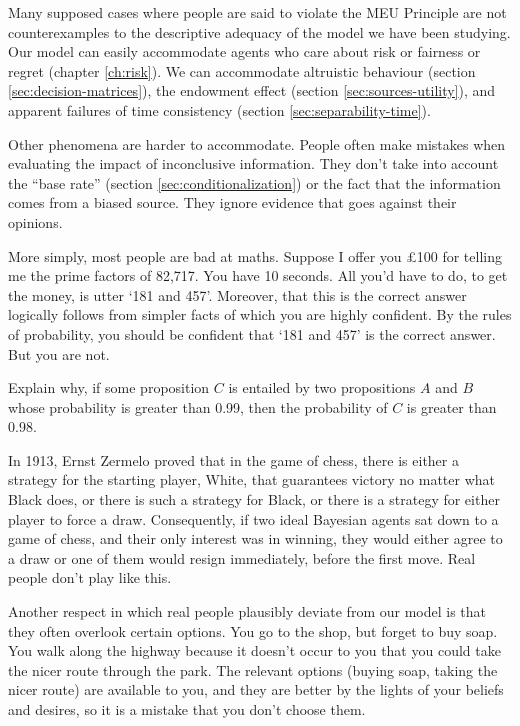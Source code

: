 Many supposed cases where people are said to violate the MEU Principle are not
counterexamples to the descriptive adequacy of the model we have been studying.
Our model can easily accommodate agents who care about risk or fairness or
regret (chapter \ref{ch:risk}). We can accommodate altruistic behaviour (section
\ref{sec:decision-matrices}), the endowment effect (section
\ref{sec:sources-utility}), and apparent failures of time consistency (section
\ref{sec:separability-time}).

Other phenomena are harder to accommodate. People often make mistakes when
evaluating the impact of inconclusive information. They don't take into account
the ``base rate'' (section \ref{sec:conditionalization}) or the fact that the
information comes from a biased source. They ignore evidence that goes against
their opinions.

More simply, most people are bad at maths. Suppose I offer you £100 for telling
me the prime factors of 82,717. You have 10 seconds. All you'd have to do, to
get the money, is utter `181 and 457'. Moreover, that this is the correct answer
logically follows from simpler facts of which you are highly confident. By the
rules of probability, you should be confident that `181 and 457' is the correct
answer. But you are not.

\begin{exercise}{3}
  Explain why, if some proposition $C$ is entailed by two propositions $A$ and
  $B$ whose probability is greater than 0.99, then the probability of $C$ is
  greater than 0.98.
\end{exercise}

In 1913, Ernst Zermelo proved that in the game of chess, there is either a
strategy for the starting player, White, that guarantees victory no matter what
Black does, or there is such a strategy for Black, or there is a strategy for
either player to force a draw. Consequently, if two ideal Bayesian agents sat
down to a game of chess, and their only interest was in winning, they would
either agree to a draw or one of them would resign immediately, before the first
move. Real people don't play like this.

Another respect in which real people plausibly deviate from our model is that
they often overlook certain options. You go to the shop, but forget to buy soap.
You walk along the highway because it doesn't occur to you that you could take
the nicer route through the park. The relevant options (buying soap, taking the
nicer route) are available to you, and they are better by the lights of your
beliefs and desires, so it is a mistake that you don't choose them.


